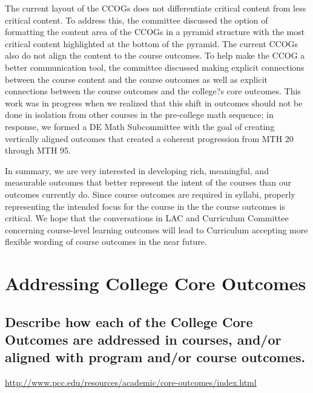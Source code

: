 The current layout of the CCOGs does not differentiate critical content from less critical content.  To address this, the committee discussed the option of formatting the content area of the CCOGs in a pyramid structure with the most critical content highlighted at the bottom of the pyramid.  The current CCOGs also do not align the content to the course outcomes. To help make the CCOG a better communication tool, the committee discussed making explicit connections between the course content and the course outcomes as well as explicit connections between the course outcomes and the college?s core outcomes.  This work was in progress when we realized that this shift in outcomes should not be done in isolation from other courses in the pre-college math sequence; in response, we formed a DE Math Subcommittee with the goal of creating vertically aligned outcomes that created a coherent progression from MTH 20 through MTH 95.

In summary, we are very interested in developing rich, meaningful, and measurable outcomes that better represent the intent of the courses than our outcomes currently do. Since course outcomes are required in syllabi, properly representing the intended focus for the course in the the course outcomes is critical. We hope that the conversations in LAC and Curriculum Committee concerning course-level learning outcomes will lead to Curriculum accepting more flexible wording of course outcomes in the near future.

\section{Addressing College Core Outcomes}

\subsection{Describe how each of the College Core Outcomes are addressed in courses, and/or aligned with program and/or course outcomes.}\url{http://www.pcc.edu/resources/academic/core-outcomes/index.html}

